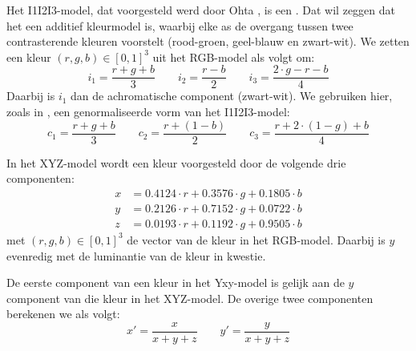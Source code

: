 Het I1I2I3-model, dat voorgesteld werd door Ohta 
\cite{ohta:color_info_for_region_segm}, is een . 
Dat wil zeggen dat het een additief kleurmodel is, waarbij elke as de overgang
tussen twee contrasterende kleuren voorstelt (rood-groen, geel-blauw en zwart-wit).
We zetten een kleur $(r,g,b) \in 
[0,1]^3$ uit het RGB-model als volgt om:
\begin{displaymath}
i_1 = \frac{r+g+b}{3} \qquad i_2 = \frac{r-b}{2} \qquad i_3 = \frac{2 \cdot g - 
r - b}{4}
\end{displaymath}
Daarbij is $i_1$ dan de achromatische component (zwart-wit). 
We gebruiken hier, zoals in \cite{wang:cbir_using_daubechies_wavelets}, een 
genormaliseerde vorm van het I1I2I3-model:
\begin{displaymath}
c_1 = \frac{r+g+b}{3} \qquad c_2 = \frac{r + (1 - b)}{2} \qquad c_3 = \frac{r + 
2 \cdot (1 - g) + b}{4}
\end{displaymath}

In het XYZ-model wordt een kleur voorgesteld door de volgende drie componenten: 
\begin{align*}
x & = 0.4124 \cdot r + 0.3576 \cdot g + 0.1805 \cdot b \\
y & = 0.2126 \cdot r + 0.7152 \cdot g + 0.0722 \cdot b \\
z & = 0.0193 \cdot r + 0.1192 \cdot g + 0.9505 \cdot b
\end{align*}
met $(r,g,b) \in [0,1]^3$ de vector van de kleur in het RGB-model. Daarbij 
is $y$ evenredig met de luminantie van de kleur in kwestie. 

De eerste component van een kleur in het Yxy-model is gelijk aan de $y$ 
component van die kleur in het XYZ-model. De overige twee componenten berekenen 
we als volgt:
\begin{displaymath}
x' = \frac{x}{x+y+z} \qquad y' = \frac{y}{x+y+z}
\end{displaymath}

